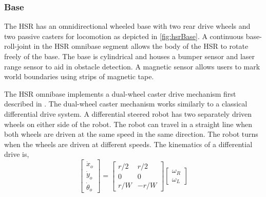 \documentclass[11pt]{article}
\begin{document}
        \subsubsection{Base} 
            The HSR has an omnidirectional wheeled base with two rear drive wheels and two passive casters for locomotion as depicted in \cref{fig:hsrBase}. A continuous base-roll-joint \footnotemark in the HSR omnibase segment allows the body of the HSR to rotate freely of the base. The base is cylindrical and houses a bumper sensor and laser range sensor to aid in obstacle detection. A magnetic sensor allows users to mark world boundaries using strips of magnetic tape.

            
            \par The HSR omnibase implements a dual-wheel caster drive mechanism first described in \cite{wada_caster_2000}. The dual-wheel caster mechanism works similarly to a classical differential drive system. A differential steered robot has two separately driven wheels on either side of the robot. The robot can travel in a straight line when both wheels are driven at the same speed in the same direction. The robot turns when the wheels are driven at different speeds. The kinematics of a differential drive is,
            \begin{equation}
                \begin{bmatrix}
                    \dot{x}_{o}\\
                    \dot{y}_{o}\\
                    \dot{\theta}_{o}
                \end{bmatrix}
                =
                \begin{bmatrix}
                    r/2 & r/2\\
                    0 & 0\\
                    r/W & -r/W
                \end{bmatrix}
                \begin{bmatrix}
                    \omega_{R}\\
                    \omega_{L}
                \end{bmatrix}
            \end{equation}
            
\end{document}
